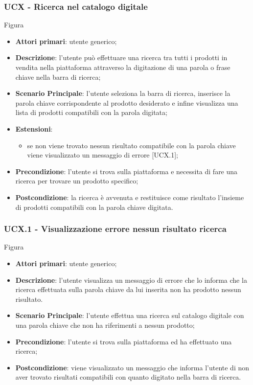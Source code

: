 \subsubsection{UCX - Ricerca nel catalogo digitale}
Figura \\
\begin{itemize}
\item \textbf{Attori primari}: utente generico;
\item \textbf{Descrizione}: l'utente può effettuare una ricerca tra tutti i prodotti in vendita nella piattaforma attraverso la digitazione di una parola o frase chiave nella barra di ricerca;
\item \textbf{Scenario Principale}: l'utente seleziona la barra di ricerca, inserisce la parola chiave corrispondente al prodotto desiderato e infine visualizza una lista di prodotti compatibili con la parola digitata;
\item \textbf{Estensioni}:
\begin{itemize}
\item se non viene trovato nessun risultato compatibile con la parola chiave viene visualizzato un messaggio di errore [UCX.1];
\end{itemize}
\item \textbf{Precondizione}: l'utente si trova sulla piattaforma e necessita di fare una ricerca per trovare un prodotto specifico;
\item \textbf{Postcondizione}: la ricerca è avvenuta e restituisce come risultato l'insieme di prodotti compatibili con la parola chiave digitata.
\end{itemize}
\subsubsection{UCX.1 - Visualizzazione errore nessun risultato ricerca}
Figura \\
\begin{itemize}
\item \textbf{Attori primari}: utente generico;
\item \textbf{Descrizione}: l'utente visualizza un messaggio di errore che lo informa che la ricerca effettuata sulla parola chiave da lui inserita non ha prodotto nessun risultato.
\item \textbf{Scenario Principale}: l'utente effettua una ricerca sul catalogo digitale con una parola chiave che non ha riferimenti a nessun prodotto;
\item \textbf{Precondizione}: l'utente si trova sulla piattaforma ed ha effettuato una ricerca;
\item \textbf{Postcondizione}: viene visualizzato un messaggio che informa l'utente di non aver trovato risultati compatibili con quanto digitato nella barra di ricerca.
\end{itemize}

